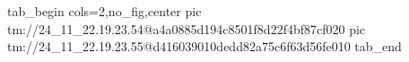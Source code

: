  
 
 
 
 

\qqSecOrig


\ifcmt
  tab_begin cols=2,no_fig,center
    pic tm://24_11_22.19.23.54@a4a0885d194c8501f8d22f4bf87cf020
    pic tm://24_11_22.19.23.55@d416039010dedd82a75c6f63d56fe010
  tab_end
\fi

